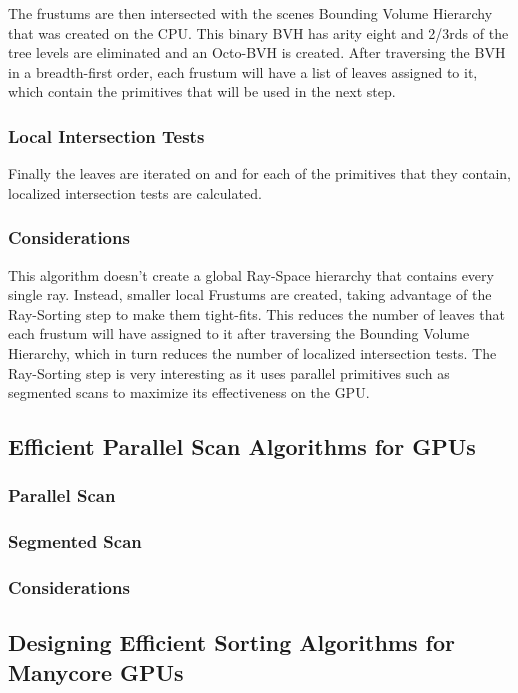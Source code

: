 \documentclass{llncs}
\begin{document}
The frustums are then intersected with the scenes Bounding Volume Hierarchy that was created on the CPU. This binary BVH has arity eight and 2/3rds of the tree levels are eliminated and an Octo-BVH is created. After traversing the BVH in a breadth-first order, each frustum will have a list of leaves assigned to it, which contain the primitives that will be used in the next step.

\subsubsection{Local Intersection Tests}

Finally the leaves are iterated on and for each of the primitives that they contain, localized intersection tests are calculated.

\subsubsection{Considerations}

This algorithm doesn't create a global Ray-Space hierarchy that contains every single ray. Instead, smaller local Frustums are created, taking advantage of the Ray-Sorting step to make them tight-fits. This reduces the number of leaves that each frustum will have assigned to it after traversing the Bounding Volume Hierarchy, which in turn reduces the number of localized intersection tests. The Ray-Sorting step is very interesting as it uses parallel primitives such as segmented scans to maximize its effectiveness on the GPU.

%
\subsection{Efficient Parallel Scan Algorithms for GPUs}
%

\subsubsection{Parallel Scan}

\subsubsection{Segmented Scan}

\subsubsection{Considerations}

%
\subsection{Designing Efficient Sorting Algorithms for Manycore GPUs}
%
\end{document}
